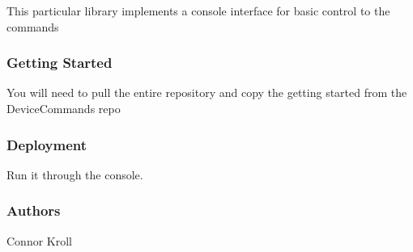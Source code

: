 This particular library implements a console interface for basic control to the commands \subsubsection*{Getting Started}

You will need to pull the entire repository and copy the getting started from the Device\+Commands repo

\subsubsection*{Deployment}

Run it through the console.

\subsubsection*{Authors}


\begin{DoxyItemize}
\item Connor Kroll 
\end{DoxyItemize}